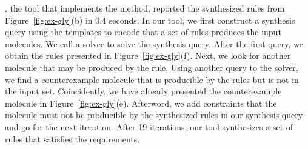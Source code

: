 \ourtool, the tool that implements the method, reported the synthesized rules from
Figure~\ref{fig:ex-gly}(b) in 0.4 seconds.
In our tool, we first construct a synthesis query using the templates to encode
that a set of rules produces the input molecules.
We call a solver to solve the synthesis query.
After the first query, we obtain the rules presented in Figure~\ref{fig:ex-gly}(f).
Next, we look for another molecule that may be produced by the rule.
Using another query to the solver, we find a counterexample molecule that is
producible by the rules but is not in the input set.
Coincidently, we have already presented the counterexample molecule in Figure~\ref{fig:ex-gly}(e).
Afterword, we add constraints that the molecule must not
be producible by the synthesized rules in our synthesis query and go for the next iteration.
After 19 iterations, our tool synthesizes a set of rules that satisfies the requirements.



